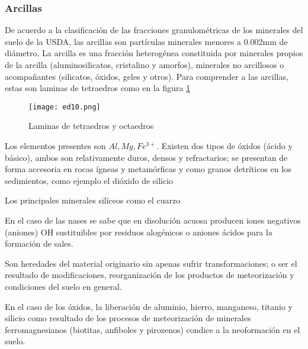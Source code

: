 \subsubsection{Arcillas}
De acuerdo a la clasificación de las fracciones granulométricas de los minerales del suelo de la USDA, las arcillas son partículas minerales menores a 0.002mm de diámetro. La arcilla es una fracción heterogénea constituida por minerales propios de la arcilla (aluminosilicatos, cristalino y amorfos), minerales no arcillosos o acompañantes (silicatos, óxidos, geles y otros).
Para comprender a las arcillas, estas son laminas de tetraedros como en la figura \ref{ed10png}
\begin{figure}[h!]
\centering
  \texttt{[image: ed10.png]}
  \caption{Laminas de tetraedros y octaedros}
  \label{ed10png}
\end{figure}
Los elementos presentes son $Al,Mg,Fe^{3+}$.
Existen dos tipos de óxidos (ácido y básico), ambos son relativamente duros, densos y refractarios; se presentan de forma accesoria en rocas ígneas y metamórficas y como granos detríticos en los sedimientos, como ejemplo el dióxido de silicio
\begin{definition}
    Los principales minerales silíceos como el cuarzo
\end{definition}
En el caso de las nases se sabe que en disolución acuosa producen iones negativos (aniones) OH sustituibles por residuos alogénicos o aniones ácidos para la formación de sales.

\begin{definition}[Arcillas]
    Son heredades del material originario sin apenas sufrir transformaciones; o ser el resultado de modificaciones, reorganización de los productos de meteorización y condiciones del suelo en general.
\end{definition}
En el caso de los óxidos, la liberación de aluminio, hierro, manganeso, titanio y silicio como resultado de los procesos de meteorización de minerales ferromagnesianos (biotitas, anfiboles y pirozenos) condice a la neoformación en el suelo.

